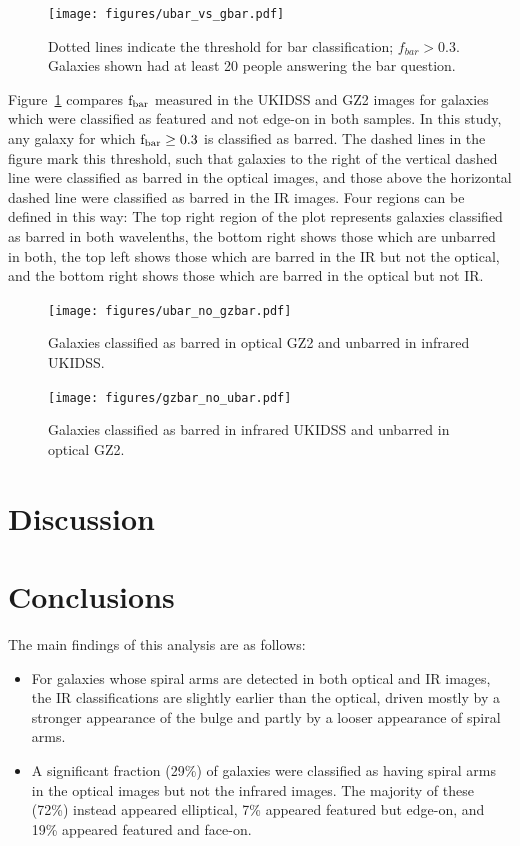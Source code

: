 \begin{figure}
\centering
\texttt{[image: figures/ubar\_vs\_gbar.pdf]}
\caption{Dotted lines indicate the threshold for bar classification; $f_{bar}>0.3$. Galaxies shown had at least 20 people answering the bar question. }
\label{fig:ubarvgbar}
\end{figure}

Figure~\ref{fig:ubarvgbar} compares $\rm f_{bar}$ measured in the UKIDSS and GZ2 images for galaxies which were classified as featured and not edge-on in both samples. In this study, any galaxy for which $\rm f_{bar} \ge 0.3$ is classified as barred. The dashed lines in the figure mark this threshold, such that galaxies to the right of the vertical dashed line were classified as barred in the optical images, and those above the horizontal dashed line were classified as barred in the IR images. Four regions can be defined in this way: The top right region of the plot represents galaxies classified as barred in both wavelenths, the bottom right shows those which are unbarred in both, the top left shows those which are barred in the IR but not the optical, and the bottom right shows those which are barred in the optical but not IR.  


\begin{figure}
\centering
\texttt{[image: figures/ubar\_no\_gzbar.pdf]}
\caption{Galaxies classified as barred in optical GZ2 and unbarred in infrared UKIDSS.}
\label{fig:ubarnogbar}
\end{figure}

\begin{figure}
\centering
\texttt{[image: figures/gzbar\_no\_ubar.pdf]}
\caption{Galaxies classified as barred in infrared UKIDSS and unbarred in optical GZ2.}
\label{fig:gbarnoubar}
\end{figure}




\section{Discussion}

\section{Conclusions}

The main findings of this analysis are as follows:

\begin{itemize}

\item For galaxies whose spiral arms are detected in both optical and IR images, the IR classifications are slightly earlier than the optical, driven mostly by a stronger appearance of the bulge and partly by a looser appearance of spiral arms. 

\item A significant fraction (29\%) of galaxies were classified as having spiral arms in the optical images but not the infrared images. The majority of these (72\%) instead appeared elliptical, 7\% appeared featured but edge-on, and 19\% appeared featured and face-on. 


\end{itemize}
